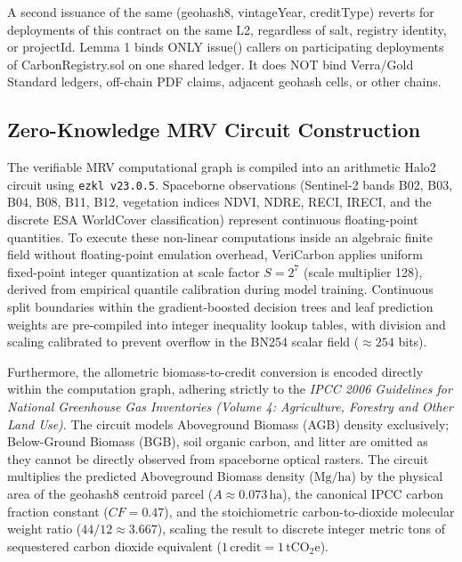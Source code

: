 \documentclass[preprint,12pt]{elsarticle}
\begin{document}
A second issuance of the same (geohash8, vintageYear, creditType) reverts for deployments of this contract on the same L2, regardless of salt, registry identity, or projectId. Lemma 1 binds ONLY issue() callers on participating deployments of CarbonRegistry.sol on one shared ledger. It does NOT bind Verra/Gold Standard ledgers, off-chain PDF claims, adjacent geohash cells, or other chains.

\subsection{Zero-Knowledge MRV Circuit Construction}

The verifiable MRV computational graph is compiled into an arithmetic Halo2 circuit using \texttt{ezkl v23.0.5}. Spaceborne observations (Sentinel-2 bands B02, B03, B04, B08, B11, B12, vegetation indices NDVI, NDRE, RECI, IRECI, and the discrete ESA WorldCover classification) represent continuous floating-point quantities. To execute these non-linear computations inside an algebraic finite field without floating-point emulation overhead, VeriCarbon applies uniform fixed-point integer quantization at scale factor $S = 2^7$ (scale multiplier 128), derived from empirical quantile calibration during model training. Continuous split boundaries within the gradient-boosted decision trees and leaf prediction weights are pre-compiled into integer inequality lookup tables, with division and scaling calibrated to prevent overflow in the BN254 scalar field ($\approx 254$ bits).

Furthermore, the allometric biomass-to-credit conversion is encoded directly within the computation graph, adhering strictly to the \textit{IPCC 2006 Guidelines for National Greenhouse Gas Inventories (Volume 4: Agriculture, Forestry and Other Land Use)}. The circuit models Aboveground Biomass (AGB) density exclusively; Below-Ground Biomass (BGB), soil organic carbon, and litter are omitted as they cannot be directly observed from spaceborne optical rasters. The circuit multiplies the predicted Aboveground Biomass density ($\text{Mg}/\text{ha}$) by the physical area of the geohash8 centroid parcel ($A \approx 0.073\,\text{ha}$), the canonical IPCC carbon fraction constant ($CF = 0.47$), and the stoichiometric carbon-to-dioxide molecular weight ratio ($44/12 \approx 3.667$), scaling the result to discrete integer metric tons of sequestered carbon dioxide equivalent ($1\,\text{credit} = 1\,\text{tCO}_2\text{e}$).
\end{document}
